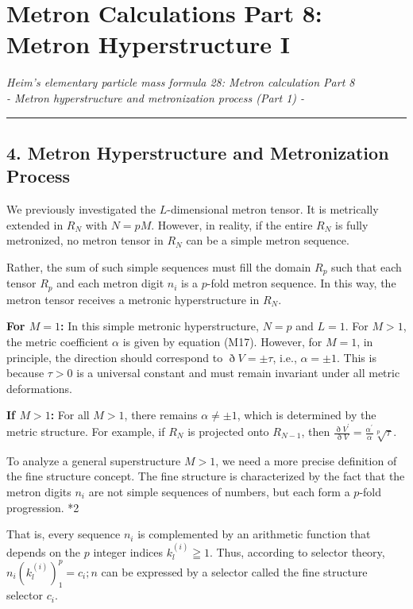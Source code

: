 \documentclass[11pt,a4paper,oneside]{article}
\newcommand{\ethop}{\eth}
\newcommand{\hr}{\par\vspace{2em}\noindent\rule{\linewidth}{0.4pt}\par\vspace{2em}}
\begin{document}
\section{Metron Calculations Part 8: Metron Hyperstructure I}
\textit{Heim's elementary particle mass formula 28: Metron calculation Part 8 \\ - Metron hyperstructure and metronization process (Part 1) -}

\hr

\subsection{4. Metron Hyperstructure and Metronization Process}
We previously investigated the $L$-dimensional metron tensor. It is metrically extended in $R_N$ with $N = pM$. However, in reality, if the entire $R_N$ is fully metronized, no metron tensor in $R_N$ can be a simple metron sequence.

Rather, the sum of such simple sequences must fill the domain $R_p$ such that each tensor $R_p$ and each metron digit $n_i$ is a $p$-fold metron sequence.
In this way, the metron tensor receives a metronic hyperstructure in $R_N$.

\textbf{For $M=1$:}
In this simple metronic hyperstructure, $N=p$ and $L=1$. For $M>1$, the metric coefficient $\alpha$ is given by equation (M17). However, for $M=1$, in principle, the direction should correspond to $\ethop V=\pm\tau$, i.e., $\alpha =\pm 1$. This is because $\tau > 0$ is a universal constant and must remain invariant under all metric deformations.

\textbf{If $M>1$:}
For all $M>1$, there remains $\alpha \neq \pm 1$, which is determined by the metric structure. For example, if $R_N$ is projected onto $R_{N-1}$, then $\frac {\ethop V^{\prime}} {\ethop V} =\frac {\alpha^{\prime}} {\alpha }\sqrt [p] {\tau}$.

To analyze a general superstructure $M>1$, we need a more precise definition of the fine structure concept. The fine structure is characterized by the fact that the metron digits $n_i$ are not simple sequences of numbers, but each form a $p$-fold progression. *2

That is, every sequence $n_i$ is complemented by an arithmetic function that depends on the $p$ integer indices $k_l^{(i)} \geqq 1$. Thus, according to selector theory, $n_i(k_l^{(i)})_1^p = c_i; n$ can be expressed by a selector called the fine structure selector $c_i$.
\end{document}
